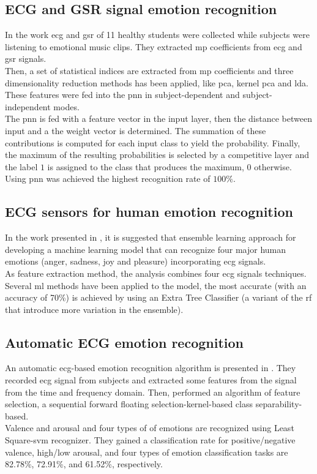 \subsection{ECG and GSR signal emotion recognition}
In the work \cite{goshvarpour2017accurate} \gls{ecg} and \gls{gsr} of 11 healthy students were collected while subjects were listening to emotional music clips. They extracted \gls{mp} coefficients from \gls{ecg} and \gls{gsr} signals.
\\ \indent
Then, a set of statistical indices are extracted from \gls{mp} coefficients and three dimensionality reduction methods has been applied, like \gls{pca}, kernel \gls{pca} and \gls{lda}. These features were fed into the \gls{pnn} in subject-dependent and subject-independent modes.
\\ \indent
The \gls{pnn} is fed with a feature vector in the input layer, then the distance between input and a the weight vector is determined. The summation of these contributions is computed  for each input class to yield the probability. Finally, the maximum of the resulting probabilities is selected by a competitive layer and the label $1$ is assigned to the class that produces the maximum, $0$ otherwise.
\\ \indent
Using \gls{pnn} was achieved the highest recognition rate of $100\%$.

\subsection{ECG sensors for human emotion recognition}
In the work presented in \cite{dissanayake2019ensemble}, it is suggested that ensemble learning approach for developing a machine learning model that can recognize four major human emotions (anger, sadness, joy and pleasure) incorporating \gls{ecg} signals.
\\ \indent
As feature extraction method, the analysis combines four \gls{ecg} signals techniques. Several \gls{ml} methods have been applied to the model, the most accurate (with an accuracy of 70\%) is achieved by using an Extra Tree Classifier (a variant of the \gls{rf} that introduce more variation in the ensemble).

\subsection{Automatic ECG emotion recognition}
An automatic \gls{ecg}-based emotion recognition algorithm is presented in \cite{hsu2017automatic}. They recorded \gls{ecg} signal from subjects and extracted some features from the signal from the time and frequency domain. Then, performed an algorithm of feature selection, a sequential forward floating selection-kernel-based class separability-based.
\\
Valence and arousal and four types of of emotions are recognized using Least Square-\gls{svm} recognizer. They gained a classification rate for positive/negative valence, high/low arousal, and four types of emotion classification tasks are 82.78\%, 72.91\%, and 61.52\%, respectively.

